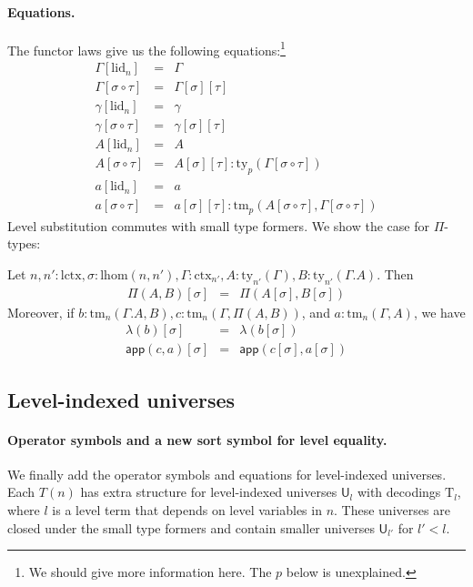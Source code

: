 \documentclass[11pt,a4paper]{article}
\theoremstyle{plain}
\theoremstyle{definition}
\newcommand{\UU}{\mathsf{U}}
\newcommand{\app}[2]{{#1\,#2}} %
\def\lhom{\mathrm{lhom}}
\def\UU{\mathsf{U}}
\def\lctx{\mathrm{lctx}}
\def\lid{\mathrm{lid}}
\newcommand{\ctx}{\mathrm{ctx}}
\newcommand{\ty}{\mathrm{ty}}
\newcommand{\tm}{\mathrm{tm}}
\def\app{\mathsf{app}}
\newcommand{\Ta}{\mathrm{T}}
\begin{document}
\paragraph{Equations.}
The functor laws give us the following equations:\footnote{%
We should give more information here. The $p$ below is unexplained.}
\begin{eqnarray*}
\Gamma[\lid_n] &=& \Gamma\\
\Gamma[\sigma \circ \tau] &=& \Gamma[\sigma][\tau]\\
\gamma[\lid_n] &=& \gamma\\
\gamma[\sigma \circ \tau] &=& \gamma[\sigma][\tau]\\
A[\lid_n] &=& A\\
A[\sigma \circ \tau] &=& A[\sigma][\tau]: \ty_p(\Gamma[\sigma \circ \tau])\\
a[\lid_n] &=& a\\
a[\sigma \circ \tau] &=& a[\sigma][\tau]: \tm_p(A[\sigma \circ \tau],\Gamma[\sigma \circ \tau])
\end{eqnarray*}
Level substitution commutes with small type formers. We show the case for $\Pi$-types:

Let $n, n' : \lctx , \sigma : \lhom(n,n'), \Gamma : \ctx_{n'}, A:\ty_{n'}(\Gamma), B:\ty_{n'}(\Gamma.A)$. Then
\begin{eqnarray*}
\Pi(A,B)[\sigma] &=& \Pi(A[\sigma],B[\sigma])
\end{eqnarray*}
Moreover, if $b : \tm_n(\Gamma.A,B), c :  \tm_n(\Gamma,\Pi(A,B))$,  and $a : \tm_n(\Gamma,A)$, we have
\begin{eqnarray*}
\lambda(b)[\sigma] &=&\lambda(b[\sigma])\\
\app(c,a)[\sigma] &=&\app(c[\sigma],a[\sigma])
\end{eqnarray*}

\subsection{Level-indexed universes} 
\paragraph{Operator symbols and a new sort symbol for level equality.} 
We finally add the operator symbols and equations for level-indexed universes.
Each $T(n)$ has extra structure for level-indexed universes $\UU_l$ with decodings $\Ta_l$, where $l$ is a level term that depends on level variables in $n$. These universes are closed under the small type formers and contain smaller universes $\UU_{l'}$ for $l' < l$.
\end{document}
